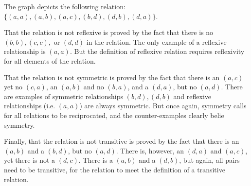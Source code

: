 The graph depicts the following relation:
$\{(a,a),(a,b),(a,c),(b,d),(d,b),(d,a)\}$.

That the relation is not reflexive is proved by the fact that there is no
$(b,b), (c,c),$ or $(d,d)$ in the relation. The only example of a reflexive
relationship is $(a,a)$. But the definition of reflexive relation requires
reflexivity for all elements of the relation.

That the relation is not symmetric is proved by the fact that there is an
$(a,c)$ yet no $(c,a)$, an $(a,b)$ and no $(b,a)$, and a $(d,a)$, but no
$(a,d)$. There are examples of symmetric relationships $(b,d),(d,b)$ and
reflexive relationships (i.e. $(a,a)$) are always symmetric. But once again,
symmetry calls for all relations to be reciprocated, and the counter-examples
clearly belie symmetry.

Finally, that the relation is not transitive is proved by the fact that there
is an $(a,b)$ and a $(b,d)$, but no $(a,d)$. There is, however, an $(d,a)$
and $(a,c)$, yet there is not a $(d,c)$. There is a $(a,b)$ and a $(d,b)$,
but again, all pairs need to be transitive, for the relation to meet the
definition of a transitive relation.
